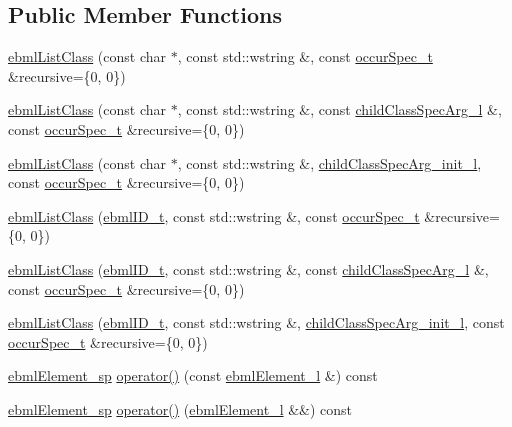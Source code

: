 \subsection*{Public Member Functions}
\begin{DoxyCompactItemize}
\item 
\mbox{\hyperlink{classebml_1_1ebmlListClass_ad49d85790f5d2b18dabf6180895f001d}{ebml\+List\+Class}} (const char $\ast$, const std\+::wstring \&, const \mbox{\hyperlink{structebml_1_1occurSpec__t}{occur\+Spec\+\_\+t}} \&recursive=\{0, 0\})
\item 
\mbox{\hyperlink{classebml_1_1ebmlListClass_afc3e7e9c4a9f663044a77793c20d67ca}{ebml\+List\+Class}} (const char $\ast$, const std\+::wstring \&, const \mbox{\hyperlink{namespaceebml_abf07998998c284c9be3f76b5d9e192e1}{child\+Class\+Spec\+Arg\+\_\+l}} \&, const \mbox{\hyperlink{structebml_1_1occurSpec__t}{occur\+Spec\+\_\+t}} \&recursive=\{0, 0\})
\item 
\mbox{\hyperlink{classebml_1_1ebmlListClass_a8a53119a28cbc5a56b16d3ddc0822116}{ebml\+List\+Class}} (const char $\ast$, const std\+::wstring \&, \mbox{\hyperlink{namespaceebml_a40cf7ad4b58caaa8c07da3ed83f7a431}{child\+Class\+Spec\+Arg\+\_\+init\+\_\+l}}, const \mbox{\hyperlink{structebml_1_1occurSpec__t}{occur\+Spec\+\_\+t}} \&recursive=\{0, 0\})
\item 
\mbox{\hyperlink{classebml_1_1ebmlListClass_ae4f1d932d3b0ba6db79b7fd43f4b9035}{ebml\+List\+Class}} (\mbox{\hyperlink{namespaceebml_a86c5f604ddf12a74aa9812e997a58691}{ebml\+I\+D\+\_\+t}}, const std\+::wstring \&, const \mbox{\hyperlink{structebml_1_1occurSpec__t}{occur\+Spec\+\_\+t}} \&recursive=\{0, 0\})
\item 
\mbox{\hyperlink{classebml_1_1ebmlListClass_a25897c22d3fdc3bf7c4f5751cabf57b6}{ebml\+List\+Class}} (\mbox{\hyperlink{namespaceebml_a86c5f604ddf12a74aa9812e997a58691}{ebml\+I\+D\+\_\+t}}, const std\+::wstring \&, const \mbox{\hyperlink{namespaceebml_abf07998998c284c9be3f76b5d9e192e1}{child\+Class\+Spec\+Arg\+\_\+l}} \&, const \mbox{\hyperlink{structebml_1_1occurSpec__t}{occur\+Spec\+\_\+t}} \&recursive=\{0, 0\})
\item 
\mbox{\hyperlink{classebml_1_1ebmlListClass_ab4ab60f7ad49e7728568920530d32dff}{ebml\+List\+Class}} (\mbox{\hyperlink{namespaceebml_a86c5f604ddf12a74aa9812e997a58691}{ebml\+I\+D\+\_\+t}}, const std\+::wstring \&, \mbox{\hyperlink{namespaceebml_a40cf7ad4b58caaa8c07da3ed83f7a431}{child\+Class\+Spec\+Arg\+\_\+init\+\_\+l}}, const \mbox{\hyperlink{structebml_1_1occurSpec__t}{occur\+Spec\+\_\+t}} \&recursive=\{0, 0\})
\item 
\mbox{\hyperlink{namespaceebml_adad533b7705a16bb360fe56380c5e7be}{ebml\+Element\+\_\+sp}} \mbox{\hyperlink{classebml_1_1ebmlListClass_a115d07c81b0433aaa0510134dabf0f66}{operator()}} (const \mbox{\hyperlink{namespaceebml_a1ddadd26791f273d851882653b9caf70}{ebml\+Element\+\_\+l}} \&) const
\item 
\mbox{\hyperlink{namespaceebml_adad533b7705a16bb360fe56380c5e7be}{ebml\+Element\+\_\+sp}} \mbox{\hyperlink{classebml_1_1ebmlListClass_a5a52d343c43baa7eeb837fb0ab660c07}{operator()}} (\mbox{\hyperlink{namespaceebml_a1ddadd26791f273d851882653b9caf70}{ebml\+Element\+\_\+l}} \&\&) const
\end{DoxyCompactItemize}
